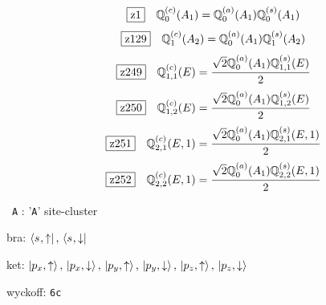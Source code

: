 \documentclass[fleqn,10pt,landscape]{jsarticle}
\begin{document}
\begin{dmath*}
\hspace*{3mm}\fbox{z1}\quad \mathbb{Q}_{0}^{(c)}(A_{1})=\mathbb{Q}_{0}^{(a)}(A_{1}) \mathbb{Q}_{0}^{(s)}(A_{1})
\end{dmath*}
\begin{dmath*}
\hspace*{3mm}\fbox{z129}\quad \mathbb{Q}_{1}^{(c)}(A_{2})=\mathbb{Q}_{0}^{(a)}(A_{1}) \mathbb{Q}_{1}^{(s)}(A_{2})
\end{dmath*}
\begin{dmath*}
\hspace*{3mm}\fbox{z249}\quad \mathbb{Q}_{1,1}^{(c)}(E)=\frac{\sqrt{2} \mathbb{Q}_{0}^{(a)}(A_{1}) \mathbb{Q}_{1,1}^{(s)}(E)}{2}
\end{dmath*}
\begin{dmath*}
\hspace*{3mm}\fbox{z250}\quad \mathbb{Q}_{1,2}^{(c)}(E)=\frac{\sqrt{2} \mathbb{Q}_{0}^{(a)}(A_{1}) \mathbb{Q}_{1,2}^{(s)}(E)}{2}
\end{dmath*}
\begin{dmath*}
\hspace*{3mm}\fbox{z251}\quad \mathbb{Q}_{2,1}^{(c)}(E,1)=\frac{\sqrt{2} \mathbb{Q}_{0}^{(a)}(A_{1}) \mathbb{Q}_{2,1}^{(s)}(E,1)}{2}
\end{dmath*}
\begin{dmath*}
\hspace*{3mm}\fbox{z252}\quad \mathbb{Q}_{2,2}^{(c)}(E,1)=\frac{\sqrt{2} \mathbb{Q}_{0}^{(a)}(A_{1}) \mathbb{Q}_{2,2}^{(s)}(E,1)}{2}
\end{dmath*}
\vspace{5mm}

\noindent\textbullet\, \texttt{A} : '\texttt{A}' site-cluster

\noindent\quad * bra: $\bra{s_{},\uparrow},\, \bra{s_{},\downarrow}$

\noindent\quad * ket: $\ket{p_{x},\uparrow},\, \ket{p_{x},\downarrow},\, \ket{p_{y},\uparrow},\, \ket{p_{y},\downarrow},\, \ket{p_{z},\uparrow},\, \ket{p_{z},\downarrow}$

\noindent\quad * wyckoff: \texttt{6c}
\end{document}
